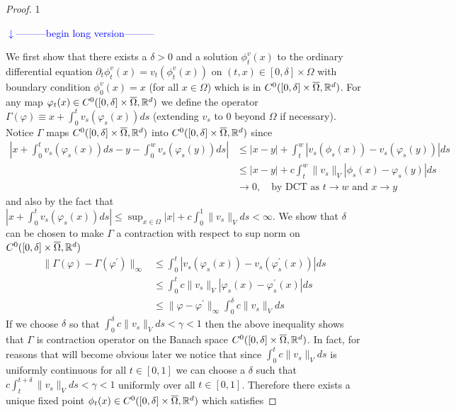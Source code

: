 \documentclass[noinfoline]{imsart}
\def\Ver{1}
\def\LongVer{1}
\begin{document}
\begin{proof} 
%
\if\Ver\LongVer{ 
{\flushleft\textcolor{blue}{$\downarrow$---------begin long version---------}}\newline

We first show that there exists a $\delta>0$ and a solution $\phi^v_t(x)$   to the ordinary differential equation $ \partial_t \phi_t^v(x) = v_t(\phi_t^v(x)) $ on $(t,x)\in [0,\delta]\times\Omega$  with boundary condition $\phi_0^v(x)=x$ (for all $x\in \Omega$) which is in $C^0 ([0,\delta]\times \overline \Omega,\Bbb R^d)$.  For any map $\varphi_t(x)\in C^0 ([0,\delta]\times \overline \Omega,\Bbb R^d)$ we define the operator $\Gamma(\varphi)\equiv x + \int_0^t v_s(\varphi_s(x))ds $ (extending $v_s$ to $0$ beyond $\Omega$ if necessary). Notice  $\Gamma$ maps $C^0 ([0,\delta]\times \overline \Omega,\Bbb R^d)$ into $C^0 ([0,\delta]\times \overline \Omega,\Bbb R^d)$  since 
\begin{align*}
|x + \int_0^t v_s(\varphi_s(x))ds  - y - \int_0^w v_s(\varphi_s(y))ds |
&\leq |x-y| + \int_t^w | v_s(\phi_s(x))-v_s(\varphi_s(y))  |ds \\
&\leq |x-y| + c\int_t^w \| v_s \|_V|\phi_s(x)-\varphi_s(y)  |ds \\
&\rightarrow 0, \quad\text{by DCT as $t\rightarrow w$ and $x\rightarrow y$}
\end{align*}
and also by the fact that $|x + \int_0^t v_s(\varphi_s(x))ds| \leq \sup_{x\in \Omega}|x| +  c\int_0^1 \|v_s\|_V ds <\infty$.
We show that $\delta$ can be chosen to make $\Gamma$ a contraction with respect to sup norm on $C^0 ([0,\delta]\times \overline \Omega,\Bbb R^d)$
\begin{align}
\|\Gamma(\varphi) - \Gamma(\varphi^\prime) \|_{\infty} &\leq \int_0^t |v_s(\varphi_s(x))-  v_s(\varphi^\prime_s(x)) |ds \nonumber\\
&\leq \int_0^t c\|v_s\|_V|\varphi_s(x)-  \varphi^\prime_s(x) |ds\nonumber \\
&\leq \|\varphi-  \varphi^\prime \|_\infty  \int_0^\delta c\|v_s\|_V ds \label{Contract}
\end{align}
If we choose $\delta$ so that $\int_0^\delta c\|v_s\|_V ds < \gamma<1$ then the above inequality shows that $\Gamma$ is contraction operator on the Banach space $C^0 ([0,\delta]\times \overline \Omega,\Bbb R^d)$. In fact, for reasons that will become obvious later we notice that since $\int_0^{t} c\| v_s \|_Vds$ is uniformly continuous for all $t\in[0,1]$ we can choose a $\delta$ such that $c\int_{t}^{t+\delta} \|v_s\|_V ds < \gamma<1$ uniformly over all $t\in [0,1]$. Therefore there exists a unique fixed point $\phi_t(x) \in C^0 ([0,\delta]\times \overline \Omega,\Bbb R^d)$ which satisfies
}
\end{proof}
\end{document}
